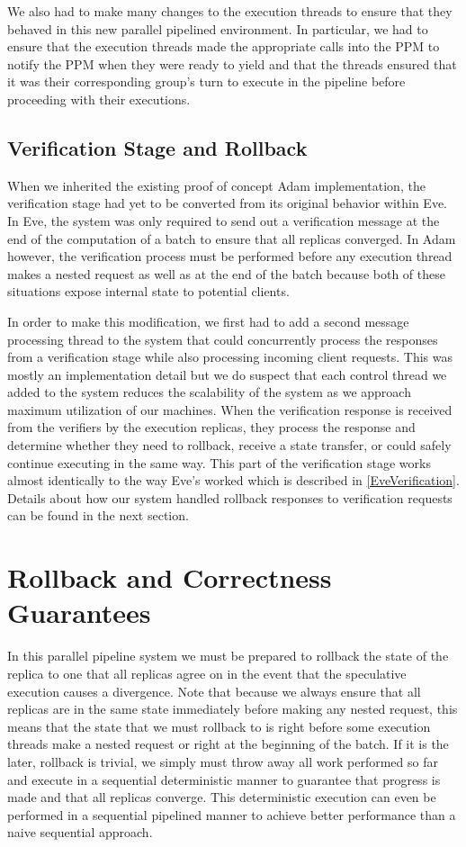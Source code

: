 \documentclass[11pt, oneside]{report}
\begin{document}
We also had to make many changes to the execution threads to ensure that they behaved in this new parallel pipelined environment.
In particular, we had to ensure that the execution threads made the appropriate calls into the PPM to notify the PPM when they were ready to yield and that the threads ensured that it was their corresponding group's turn to execute in the pipeline before proceeding with their executions.

\subsection{Verification Stage and Rollback}\label{Verification}

When we inherited the existing proof of concept Adam implementation, the verification stage had yet to be converted from its original behavior within Eve.
In Eve, the system was only required to send out a verification message at the end of the computation of a batch to ensure that all replicas converged.
In Adam however, the verification process must be performed before any execution thread makes a nested request as well as at the end of the batch because both of these situations expose internal state to potential clients.

In order to make this modification, we first had to add a second message processing thread to the system that could concurrently process the responses from a verification stage while also processing incoming client requests. 
This was mostly an implementation detail but we do suspect that each control thread we added to the system reduces the scalability of the system as we approach maximum utilization of our machines.
When the verification response is received from the verifiers by the execution replicas, they process the response and determine whether they need to rollback, receive a state transfer, or could safely continue executing in the same way. 
This part of the verification stage works almost identically to the way Eve's worked which is described in \ref{EveVerification}.
Details about how our system handled rollback responses to verification requests can be found in the next section.

\section{Rollback and Correctness Guarantees}

In this parallel pipeline system we must be prepared to rollback the state of the replica to one that all replicas agree on in the event that the speculative execution causes a divergence. 
Note that because we always ensure that all replicas are in the same state immediately before making any nested request, this means that the state that we must rollback to is right before some execution threads make a nested request or right at the beginning of the batch. 
If it is the later, rollback is trivial, we simply must throw away all work performed so far and execute in a sequential deterministic manner to guarantee that progress is made and that all replicas converge. 
This deterministic execution can even be performed in a sequential pipelined manner to achieve better performance than a naive sequential approach.
\end{document}
